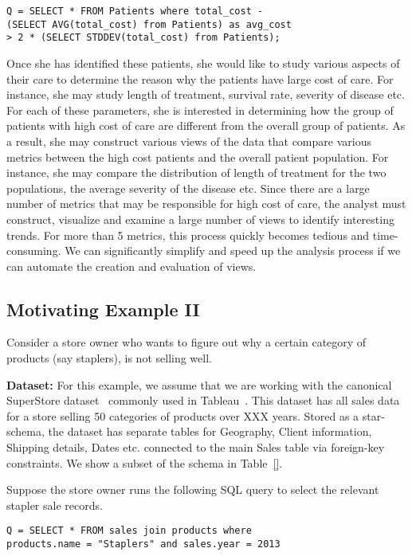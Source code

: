 \noindent 
\begin{small}
\begin{verbatim}
Q = SELECT * FROM Patients where total_cost - 
(SELECT AVG(total_cost) from Patients) as avg_cost
> 2 * (SELECT STDDEV(total_cost) from Patients);
\end{verbatim}
\end{small}

Once she has identified these patients, she would like to study various aspects
of their care to determine the reason why the patients have large cost of care. For
instance, she may study length of treatment, survival rate, severity of disease
etc. For each of these parameters, she is interested in determining how the
group of patients with high cost of care are different from the overall group of
patients. As a result, she may construct various views of the data that
compare various metrics between the high cost patients and the overall patient
population. For instance, she may compare the distribution of length of
treatment for the two populations, the average severity of the disease
etc. Since there are a large number of metrics that may be responsible for high
cost of care, the analyst must construct, visualize and examine a large number
of views to identify interesting trends. For more than 5 metrics, this process
quickly becomes tedious and time-consuming. We can significantly simplify and
speed up the analysis process if we can automate the creation and evaluation of
views.

\subsection{Motivating Example II}
\label{subsec:motivation_example2}

Consider a store owner who wants to figure out why a certain category of
products (say staplers), is not selling well. 

{\bf Dataset:} For this example, we assume that we are working with the
canonical SuperStore dataset~\cite{superstore} commonly used in
Tableau~\cite{tableau}. This dataset has all sales data for a store selling 50
categories of products over XXX years. Stored as a star-schema, the dataset has
separate tables for Geography, Client information, Shipping details,
Dates etc. connected to the main Sales table via foreign-key constraints. We
show a subset of the schema in Table~\ref{}.

Suppose the store owner runs the following SQL query to select the relevant
stapler sale records.
\noindent 
\begin{small}
\begin{verbatim}
Q = SELECT * FROM sales join products where 
products.name = "Staplers" and sales.year = 2013
\end{verbatim}
\end{small}

